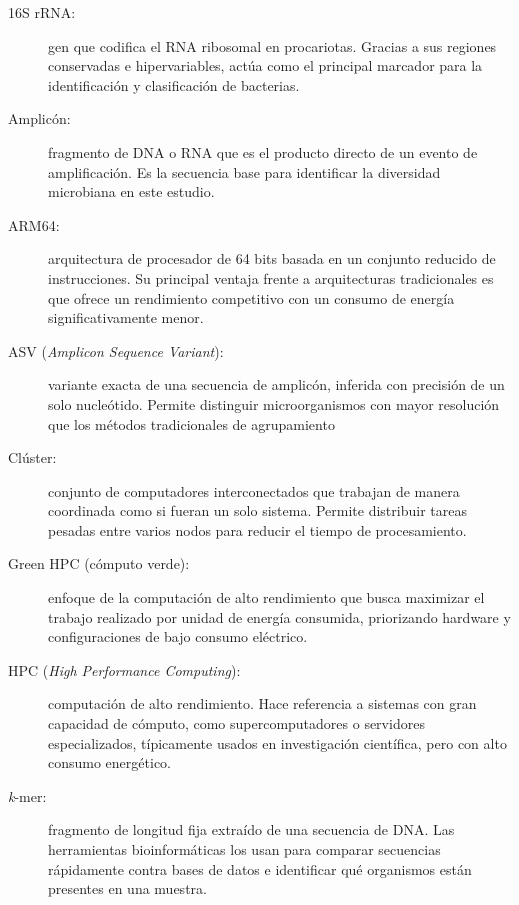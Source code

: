 \documentclass[12pt,oneside,spanish]{book}
\begin{document}
    \begin{description}
        \item[16S rRNA:] gen que codifica el RNA ribosomal en procariotas. Gracias a sus regiones conservadas e hipervariables, actúa como el principal marcador para la identificación y clasificación de bacterias.
        \item[Amplicón:] fragmento de DNA o RNA que es el producto directo de un evento de amplificación. Es la secuencia base para identificar la diversidad microbiana en este estudio.
        
        \item[ARM64:] arquitectura de procesador de 64 bits basada en un conjunto reducido de instrucciones. Su principal ventaja frente a arquitecturas tradicionales es que ofrece un rendimiento competitivo con un consumo de energía significativamente menor.
        
        \item[ASV (\textit{Amplicon Sequence Variant}):] variante exacta de una secuencia de amplicón, inferida con precisión de un solo nucleótido. Permite distinguir microorganismos con mayor resolución que los métodos tradicionales de agrupamiento
        
        \item[Clúster:] conjunto de computadores interconectados que trabajan de manera coordinada como si fueran un solo sistema. Permite distribuir tareas pesadas entre varios nodos para reducir el tiempo de procesamiento.
        
        \item[Green HPC (cómputo verde):] enfoque de la computación de alto rendimiento que busca maximizar el trabajo realizado por unidad de energía consumida, priorizando hardware y configuraciones de bajo consumo eléctrico.
        
        \item[HPC (\textit{High Performance Computing}):] computación de alto rendimiento. Hace referencia a sistemas con gran capacidad de cómputo, como supercomputadores o servidores especializados, típicamente usados en investigación científica, pero con alto consumo energético.
        \newpage
        
        \item[\textit{k}-mer:] fragmento de longitud fija extraído de una secuencia de DNA. Las herramientas bioinformáticas los usan para comparar secuencias rápidamente contra bases de datos e identificar qué organismos están presentes en una muestra.
        

\end{description}
\end{document}

